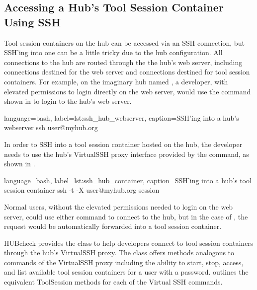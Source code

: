 \subsection{Accessing a Hub's Tool Session Container Using SSH}
\label{ssec:hubcheck_shell_modules_accessing_container_ssh}

Tool session containers on the hub can be accessed via an SSH connection, but
SSH'ing into one can be a little tricky due to the hub configuration. All
connections to the hub are routed through the the hub's web server, including
connections destined for the web server and connections destined for tool
session containers. For example, on the imaginary hub named
, a developer, with elevated permissions to login
directly on the web server, would use the command shown in
 to login to the hub's web server.

\begin{xcode}{%
  language=bash,%
  label=lst:ssh_hub_webserver,%
  caption={SSH'ing into a hub's webserver}%
}
ssh user@myhub.org
\end{xcode}

In order to SSH into a tool session container hosted on the hub, the developer
needs to use the hub's VirtualSSH proxy interface provided by the
 command, as shown in
.

\begin{xcode}{%
  language=bash,%
  label=lst:ssh_hub_container,%
  caption={SSH'ing into a hub's tool session container}%
}
ssh -t -X user@myhub.org session
\end{xcode}

Normal users, without the elevated permissions needed to login on the web
server, could use either command to connect to the hub, but in the case of
, the request would be automatically
forwarded into a tool session container.

HUBcheck provides the  class to help developers connect to
tool session containers through the hub's VirtualSSH proxy. The
 class offers methods analogous to commands of the
VirtualSSH proxy including the ability to start, stop, access, and list
available tool session containers for a user with a password.
 outlines the equivalent ToolSession methods for
each of the Virtual SSH commands.

